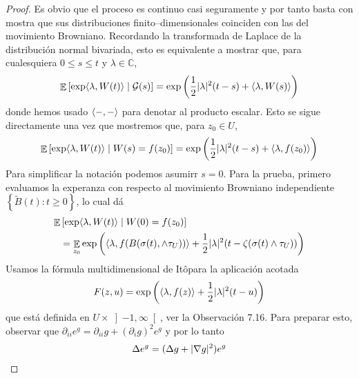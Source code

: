 \documentclass{article}
\newcommand{\ito}{Itô}
\newcommand{\brownian}{B}
\newcommand{\alteredBrownian}{\widetilde{\brownian}}
\newcommand{\wiener}{W}
\newcommand{\placeholderParameter}{-}
\newcommand{\complexNumbers}{\mathbb{C}}
\DeclareMathOperator{\Expectation}{\mathbb{E}}
\DeclarePairedDelimiter{\abs}{\lvert}{\rvert}
\DeclarePairedDelimiter{\ang}{\langle}{\rangle}
\theoremstyle{plain}
\theoremstyle{remark}
\theoremstyle{definition}
\begin{document}
\begin{proof}
  Es obvio que el proceso es continuo casi seguramente y por tanto basta con mostra que sus distribuciones finito--dimensionales coinciden con las del movimiento Browniano.
  Recordando la transformada de Laplace de la distribución normal bivariada, esto es equivalente a mostrar que, para cualesquiera \(0 \leq s \leq t\) y \(\lambda \in \complexNumbers\),
  \begin{align}
    \Expectation\left[ \exp \ang{\lambda, \wiener(t)} \mid \mathcal{G}(s) \right]
    =
    \exp\left( \frac{1}{2} \abs{\lambda}^2 (t - s) + \ang{\lambda, \wiener(s)} \right)
  \end{align}
  donde hemos usado \(\ang{\placeholderParameter , \placeholderParameter}\) para denotar al producto escalar.
  Esto se sigue directamente una vez que mostremos que, para \(z_0 \in U\),
  \begin{align}
    \label{equation:ConformalInvarianceOfPlanarBrownianMotion_MainEquation}
    \Expectation\left[ 
      \exp\ang{\lambda, \wiener(t)} 
      \mid \wiener(s) = f(z_0)
    \right]
    =
    \exp\left( \frac{1}{2} \abs{\lambda}^2 (t - s) + \ang{\lambda, f(z_0)} \right)
  \end{align}
  Para simplificar la notación podemos asumirr \(s = 0\).
  Para la prueba, primero evaluamos la experanza con respecto al movimiento Browniano independiente \(\left\{ \alteredBrownian(t) : t \geq 0 \right\}\), lo cual dá
  \begin{align}
    \Expectation &\left[
      \exp \ang{\lambda, \wiener(t)}
      \mid 
      \wiener(0) = f(z_0) 
    \right]
    \\&=
    \Expectation_{z_0} \exp \left(
      \ang{\lambda, f(\brownian(\sigma(t), \wedge \tau_U))} 
      + \frac{1}{2} \abs{\lambda}^2 (t - \zeta(\sigma(t) \wedge \tau_U))
    \right)
  \end{align}
  Usamos la fórmula multidimensional de \ito para la aplicación acotada
  \begin{align}
    F(z, u)
    =
    \exp\left(
      \ang{\lambda, f(z)}
      + \frac{1}{2} \abs{\lambda}^2 (t - u)
    \right)
  \end{align}
  que está definida en \(U \times \left] - 1, \infty \right[\), ver la Observación 7.16.
  Para preparar esto, observar que \(\partial_{i i} e^g = \partial_{i i} g + (\partial_i g)^2 e^g\) y por lo tanto
  \begin{align}
    \label{equation:LaplacianOfExponential}
    \Delta e^g
    =
    (\Delta g + \abs{\nabla g}^2) e^g

\end{align}
\end{proof}
\end{document}
